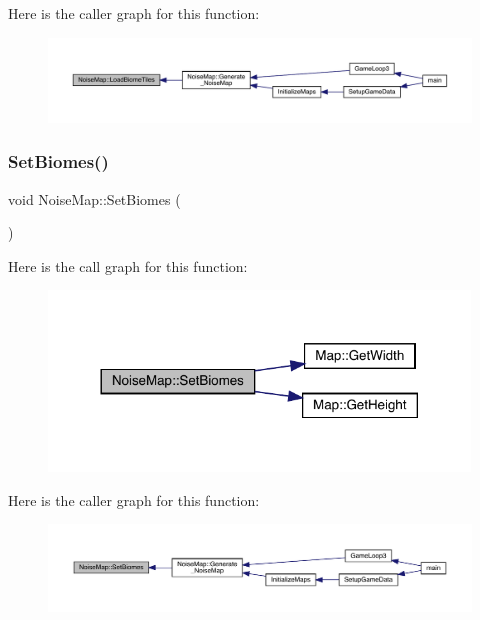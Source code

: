 Here is the caller graph for this function\+:
\nopagebreak
\begin{figure}[H]
\begin{center}
\leavevmode
\includegraphics[width=350pt]{class_noise_map_ad8e07b9a0fc70191c781f1cdfef66b54_icgraph}
\end{center}
\end{figure}
\mbox{\label{class_noise_map_a12446f47eb5f29d25f7538ebaf0713a4}} 
\subsubsection{\texorpdfstring{Set\+Biomes()}{SetBiomes()}}
{\footnotesize\ttfamily void Noise\+Map\+::\+Set\+Biomes (\begin{DoxyParamCaption}{ }\end{DoxyParamCaption})}

Here is the call graph for this function\+:
\nopagebreak
\begin{figure}[H]
\begin{center}
\leavevmode
\includegraphics[width=317pt]{class_noise_map_a12446f47eb5f29d25f7538ebaf0713a4_cgraph}
\end{center}
\end{figure}
Here is the caller graph for this function\+:
\nopagebreak
\begin{figure}[H]
\begin{center}
\leavevmode
\includegraphics[width=350pt]{class_noise_map_a12446f47eb5f29d25f7538ebaf0713a4_icgraph}
\end{center}
\end{figure}


